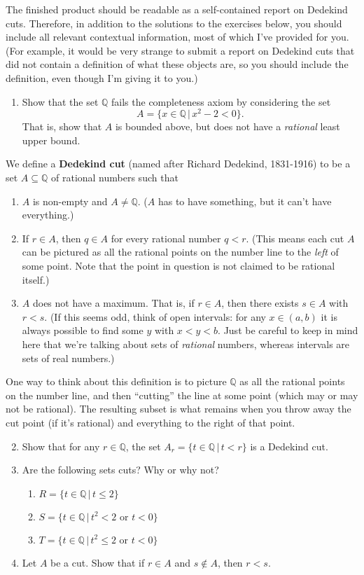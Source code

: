 \documentclass[letterpaper,12pt]{article}
\newcommand{\Q}{\mathbb{Q}}
\begin{document}
The finished product should be readable as a self-contained report on Dedekind cuts. Therefore, in addition to the solutions to the exercises below, you should include all relevant contextual information, most of which I've provided for you. (For example, it would be very strange to submit a report on Dedekind cuts that did not contain a definition of what these objects are, so you should include the definition, even though I'm giving it to you.)



\begin{enumerate}
\item Show that the set $\Q$ fails the completeness axiom by considering the set 
\[
A=\{x\in\Q \,|\, x^2-2<0\}.
\]
That is, show that $A$ is bounded above, but does not have a {\em rational} least upper bound.
\end{enumerate}
We define a {\bf Dedekind cut} (named after Richard Dedekind, 1831-1916) to be a set $A\subseteq \Q$ of rational numbers such that
\begin{enumerate}[\hspace{12pt}(i)]
 \item $A$ is non-empty and $A\neq \Q$. ($A$ has to have something, but it can't have everything.)
 \item If $r\in A$, then $q\in A$ for every rational number $q<r$. (This means each cut $A$ can be pictured as all the rational points on the number line to the {\em left} of some point. Note that the point in question is not claimed to be rational itself.)
 \item $A$ does not have a maximum. That is, if $r\in A$, then there exists $s\in A$ with $r<s$. (If this seems odd, think of open intervals: for any $x\in (a,b)$ it is always possible to find some $y$ with $x<y<b$. Just be careful to keep in mind here that we're talking about sets of {\em rational} numbers, whereas intervals are sets of real numbers.)
\end{enumerate}
One way to think about this definition is to picture $\Q$ as all the rational points on the number line, and then ``cutting'' the line at some point (which may or may not be rational). The resulting subset is what remains when you throw away the cut point (if it's rational) and everything to the right of that point.
\begin{enumerate}
\setcounter{enumi}{1}
\item Show that for any $r\in \Q$, the set $A_r = \{t\in \Q\,|\, t<r\}$ is a Dedekind cut.

\item Are the following sets cuts? Why or why not?
\begin{enumerate}
 \item $R = \{t\in\Q\,|\, t\leq 2\}$
 \item $S = \{t\in\Q\,|\, t^2<2 \text{ or } t<0\}$
 \item $T = \{t\in\Q\,|\, t^2\leq 2 \text{ or } t<0\}$
\end{enumerate}

\item Let $A$ be a cut. Show that if $r\in A$ and $s\notin A$, then $r<s$.

\end{enumerate}
\end{document}
